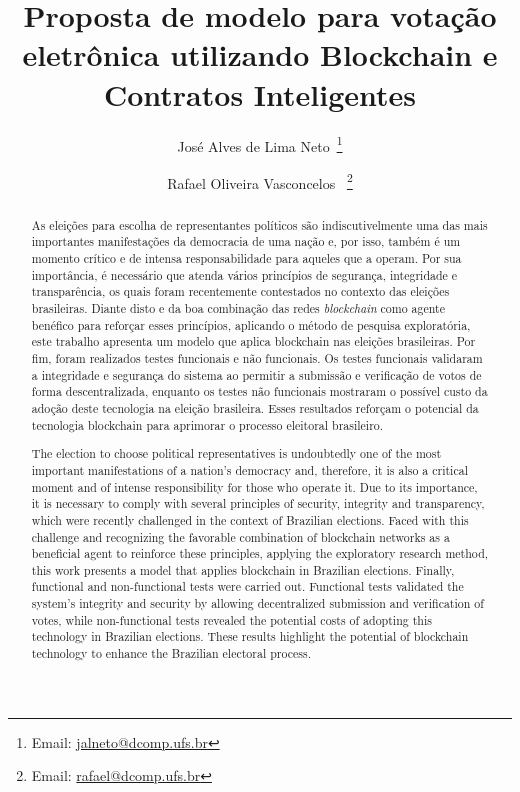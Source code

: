 \documentclass[portuguese]{textolivre}
\title{Proposta de modelo para votação eletrônica utilizando Blockchain e Contratos Inteligentes}
\author[1]{José Alves de Lima Neto~\orcid{0009-0001-1324-9513}\thanks{Email: \href{mailto:jalneto@dcomp.ufs.br}{jalneto@dcomp.ufs.br}}}
\author[1]{Rafael Oliveira Vasconcelos ~\orcid{0000-0001-7974-304X}\thanks{Email: \href{mailto:rafael@dcomp.ufs.br}{rafael@dcomp.ufs.br}}}
\affil[1]{Universidade Federal de Sergipe, DComp, São Cristóvão, SE, Brasil.}
\begin{document}
	\maketitle
	
	\begin{polyabstract}
		
		\begin{portuguese}
			\begin{abstract}
				As eleições para escolha de representantes políticos são indiscutivelmente uma das mais importantes manifestações da democracia de uma nação e, por isso, também é um momento crítico e de intensa responsabilidade para aqueles que a operam. Por sua importância, é necessário que atenda vários princípios de segurança, integridade e transparência, os quais foram recentemente contestados no contexto das eleições brasileiras.
				Diante disto e da boa combinação das redes \textit{blockchain} como agente benéfico para reforçar esses princípios, aplicando o método de pesquisa exploratória, este trabalho apresenta um modelo que aplica blockchain nas eleições brasileiras. Por fim, foram realizados testes funcionais e não funcionais. Os testes funcionais validaram a integridade e segurança do sistema ao permitir a submissão e verificação de votos de forma descentralizada, enquanto os testes não funcionais mostraram o possível custo da adoção deste tecnologia na eleição brasileira. Esses resultados reforçam o potencial da tecnologia blockchain para aprimorar o processo eleitoral brasileiro.
				
			\end{abstract}
		\end{portuguese}
		
		\begin{english}
			\begin{abstract}
				
				The election to choose political representatives is undoubtedly one of the most important manifestations of a nation's democracy and, therefore, it is also a critical moment and of intense responsibility for those who operate it. Due to its importance, it is necessary to comply with several principles of security, integrity and transparency, which were recently challenged in the context of Brazilian elections. Faced with this challenge and recognizing the favorable combination of blockchain networks as a beneficial agent to reinforce these principles, applying the exploratory research method, this work presents a model that applies blockchain in Brazilian elections. Finally, functional and non-functional tests were carried out. Functional tests validated the system's integrity and security by allowing decentralized submission and verification of votes, while non-functional tests revealed the potential costs of adopting this technology in Brazilian elections. These results highlight the potential of blockchain technology to enhance the Brazilian electoral process.
				

\end{abstract}
\end{english}
\end{polyabstract}
\end{document}

